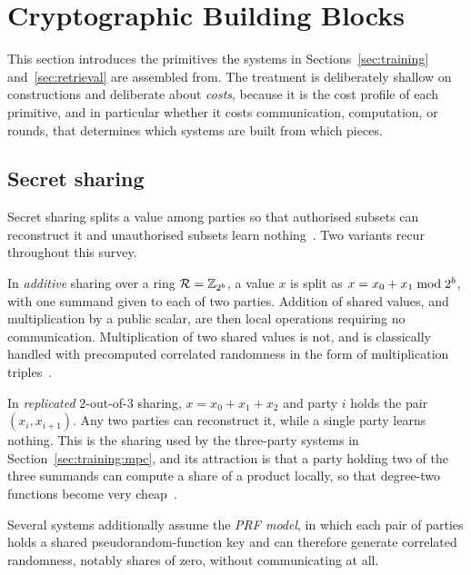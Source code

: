\section{Cryptographic Building Blocks}
\label{sec:prim}

This section introduces the primitives the systems in Sections~\ref{sec:training}
and~\ref{sec:retrieval} are assembled from. The treatment is deliberately shallow on
constructions and deliberate about \emph{costs}, because it is the cost profile of each primitive,
and in particular whether it costs communication, computation, or rounds, that determines
which systems are built from which pieces.

\subsection{Secret sharing}
\label{sec:prim:sharing}

Secret sharing splits a value among parties so that authorised subsets can reconstruct it and
unauthorised subsets learn nothing~\cite{shamir1979}. Two variants recur throughout this survey.

In \emph{additive} sharing over a ring $\mathcal{R} = \mathbb{Z}_{2^{b}}$, a value $x$ is split as
$x = x_0 + x_1 \bmod 2^{b}$, with one summand given to each of two parties. Addition of shared
values, and multiplication by a public scalar, are then local operations requiring no
communication. Multiplication of two shared values is not, and is classically handled with
precomputed correlated randomness in the form of multiplication triples~\cite{beaver1991}.

In \emph{replicated} $2$-out-of-$3$ sharing, $x = x_0 + x_1 + x_2$ and party $i$ holds the pair
$(x_i, x_{i+1})$. Any two parties can reconstruct it, while a single party learns nothing. This is the
sharing used by the three-party systems in Section~\ref{sec:training:mpc}, and its attraction is
that a party holding two of the three summands can compute a share of a product locally, so that
degree-two functions become very cheap~\cite{araki2016}.

Several systems additionally assume the \emph{PRF model}, in which each pair of parties holds a
shared pseudorandom-function key and can therefore generate correlated randomness, notably
shares of zero, without communicating at all.

